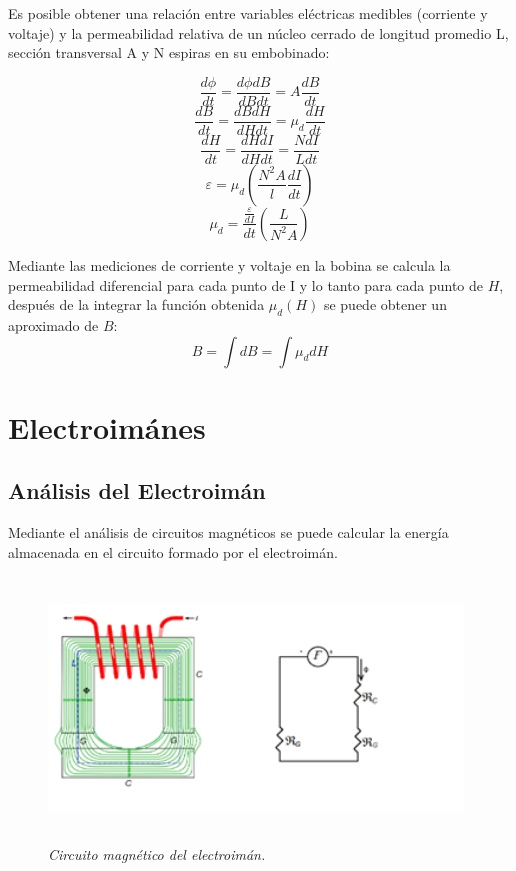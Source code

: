 Es posible obtener una relación entre variables eléctricas medibles (corriente y voltaje)  y la permeabilidad relativa de un núcleo cerrado de longitud promedio L, sección transversal A y N espiras en su embobinado:

\begin{equation}
	\frac{d \phi}{dt} = \frac{d \phi dB}{dB dt} = A \frac{dB}{dt}
\end{equation}
\begin{equation}
	\frac{dB}{dt} = \frac{dB dH}{dH dt} = \mu_d \frac{dH}{dt}
\end{equation}
\begin{equation}
	\frac{dH}{dt} = \frac{dH dI}{dH dt} = \frac{N dI}{L dt}
\end{equation}
\begin{equation}
	\varepsilon = \mu_d (\frac{N^2 A}{l} \frac{dI}{dt})
\end{equation}
\begin{equation}
	\mu_d= \frac{\frac{\varepsilon}{dI}}{dt} (\frac{L}{N^2 A})
\end{equation}

Mediante las mediciones de corriente y voltaje en la bobina se calcula la permeabilidad diferencial para cada punto de I y lo tanto para cada punto de $H$, después de la  integrar la función obtenida $\mu_d (H)$  se puede obtener un aproximado de $B$:
\begin{equation}
	B = \int dB = \int \mu_d dH
\end{equation}

\section{Electroimánes}
\label{sec:related:sec3}
\subsection{Análisis del Electroimán}	

Mediante el análisis de circuitos magnéticos se puede calcular la energía almacenada en el circuito formado por el electroimán.
\begin{figure}[htb]
\begin{center}
\centering
	\includegraphics[width=11cm, height=7cm]{images/Capitulo_1/Circuito_magnetico_del_electroiman}
	\caption{\textit{Circuito magnético del electroimán.}}
	\label{fig:system:example1}	
\end{center}
\end{figure}

